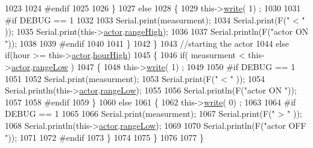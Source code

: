 \begin{DoxyCode}
1023 
1024 \textcolor{preprocessor}{            #endif  }
1025 
1026             \}
1027             \textcolor{keywordflow}{else} 
1028             \{
1029                 this->\hyperlink{class_cool_board_actor_a958786ff01ea1056ee72c72d439f86da}{write}( 1) ;
1030 
1031 \textcolor{preprocessor}{            #if DEBUG == 1 }
1032 
1033                 Serial.print(measurment);
1034                 Serial.print(F(\textcolor{stringliteral}{" < "} ));
1035                 Serial.print(this->\hyperlink{class_cool_board_actor_a8f190db9f7a39fddbcef7f152da970e9}{actor}.\hyperlink{struct_cool_board_actor_1_1state_a6e5cd6c5cd44e2decfd8d4df1853f8e3}{rangeHigh});
1036 
1037                 Serial.println(F(\textcolor{stringliteral}{"actor ON "}));
1038 
1039 \textcolor{preprocessor}{            #endif  }
1040                 
1041             \}
1042     \}
1043     \textcolor{comment}{//starting the actor}
1044     \textcolor{keywordflow}{else} \textcolor{keywordflow}{if}(hour >= this->\hyperlink{class_cool_board_actor_a8f190db9f7a39fddbcef7f152da970e9}{actor}.\hyperlink{struct_cool_board_actor_1_1state_acd1af3ac2382258a5b05497d814adc01}{hourHigh})
1045     \{
1046             \textcolor{keywordflow}{if}( measurment < this->\hyperlink{class_cool_board_actor_a8f190db9f7a39fddbcef7f152da970e9}{actor}.\hyperlink{struct_cool_board_actor_1_1state_a43f891c9fb3bb63575c27cec860de55a}{rangeLow} )
1047             \{
1048                 this->\hyperlink{class_cool_board_actor_a958786ff01ea1056ee72c72d439f86da}{write}( 1) ;
1049 
1050 \textcolor{preprocessor}{            #if DEBUG == 1 }
1051 
1052                 Serial.print(measurment);
1053                 Serial.print(F(\textcolor{stringliteral}{" < "} ));
1054                 Serial.println(this->\hyperlink{class_cool_board_actor_a8f190db9f7a39fddbcef7f152da970e9}{actor}.\hyperlink{struct_cool_board_actor_1_1state_a43f891c9fb3bb63575c27cec860de55a}{rangeLow});
1055 
1056                 Serial.println(F(\textcolor{stringliteral}{"actor ON "}));
1057 
1058 \textcolor{preprocessor}{            #endif  }
1059             \}
1060             \textcolor{keywordflow}{else} 
1061             \{
1062                 this->\hyperlink{class_cool_board_actor_a958786ff01ea1056ee72c72d439f86da}{write}( 0) ;
1063 
1064 \textcolor{preprocessor}{            #if DEBUG == 1 }
1065 
1066                 Serial.print(measurment);
1067                 Serial.print(F(\textcolor{stringliteral}{" > "} ));
1068                 Serial.println(this->\hyperlink{class_cool_board_actor_a8f190db9f7a39fddbcef7f152da970e9}{actor}.\hyperlink{struct_cool_board_actor_1_1state_a43f891c9fb3bb63575c27cec860de55a}{rangeLow});
1069 
1070                 Serial.println(F(\textcolor{stringliteral}{"actor OFF "}));
1071 
1072 \textcolor{preprocessor}{            #endif                  }
1073             \}
1074 
1075     \}
1076 
1077 \}
\end{DoxyCode}
